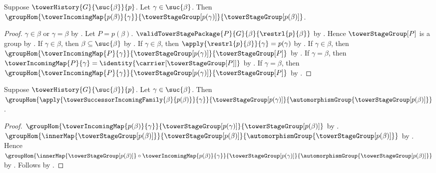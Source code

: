 \begin{proposition}\label{tower_successor_predecessor_incoming_hom}
    Suppose $\towerHistory{G}{\suc{\beta}}{p}$.
    Let $\gamma\in\suc{\beta}$.
    Then $\groupHom
        {\towerIncomingMap{p(\beta)}{\gamma}}
        {\towerStageGroup[p(\gamma)]}
        {\towerStageGroup[p(\beta)]}$.
\end{proposition}
\begin{proof}
    $\gamma\in\beta$ or $\gamma=\beta$ by
        .
    Let $P=p(\beta)$.
    $\validTowerStagePackage{P}{G}{\beta}{\restrl{p}{\beta}}$ by
        .
    Hence $\towerStageGroup[P]$ is a group by
        .
    If $\gamma\in\beta$, then $\beta\subseteq\suc{\beta}$ by
        .
    If $\gamma\in\beta$, then
        $\apply{\restrl{p}{\beta}}{\gamma}=p(\gamma)$ by
        .
    If $\gamma\in\beta$, then
        $\groupHom
            {\towerIncomingMap{P}{\gamma}}
            {\towerStageGroup[p(\gamma)]}
            {\towerStageGroup[P]}$ by
        .
    If $\gamma=\beta$, then
        $\towerIncomingMap{P}{\gamma}=
            \identity{\carrier[\towerStageGroup[P]]}$ by
        .
    If $\gamma=\beta$, then
        $\groupHom
            {\towerIncomingMap{P}{\gamma}}
            {\towerStageGroup[p(\gamma)]}
            {\towerStageGroup[P]}$ by
        .
\end{proof}

\begin{proposition}\label{tower_successor_incoming_hom}
    Suppose $\towerHistory{G}{\suc{\beta}}{p}$.
    Let $\gamma\in\suc{\beta}$.
    Then $\groupHom
        {\apply{\towerSuccessorIncomingFamily{\beta}{p(\beta)}}{\gamma}}
        {\towerStageGroup[p(\gamma)]}
        {\automorphismGroup{\towerStageGroup[p(\beta)]}}$.
\end{proposition}
\begin{proof}
    $\groupHom
        {\towerIncomingMap{p(\beta)}{\gamma}}
        {\towerStageGroup[p(\gamma)]}
        {\towerStageGroup[p(\beta)]}$ by
        .
    $\groupHom
        {\innerMap{\towerStageGroup[p(\beta)]}}
        {\towerStageGroup[p(\beta)]}
        {\automorphismGroup{\towerStageGroup[p(\beta)]}}$ by
        .
    Hence $\groupHom
        {\innerMap{\towerStageGroup[p(\beta)]}\circ
            \towerIncomingMap{p(\beta)}{\gamma}}
        {\towerStageGroup[p(\gamma)]}
        {\automorphismGroup{\towerStageGroup[p(\beta)]}}$ by
        .
    Follows by .
\end{proof}

